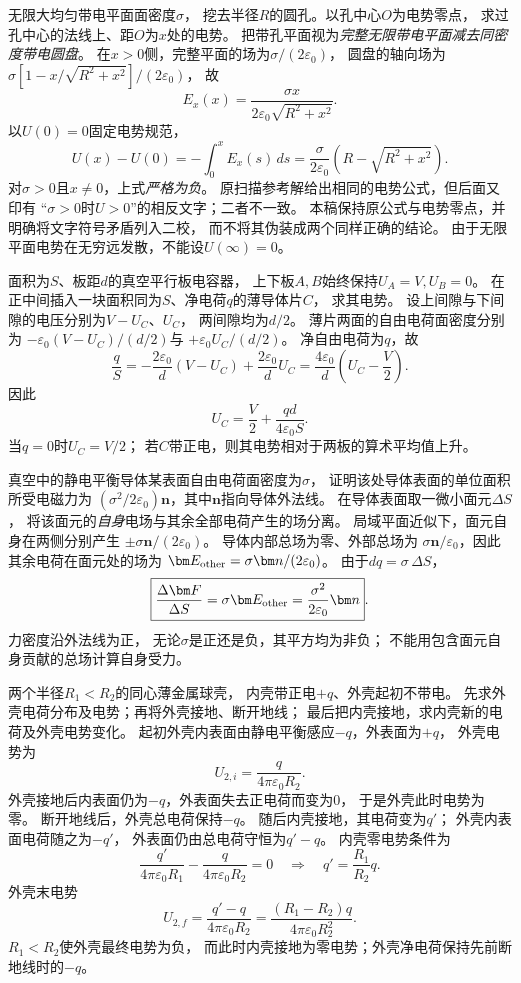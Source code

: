 \problemtext 无限大均匀带电平面面密度$\sigma$，
挖去半径$R$的圆孔。以孔中心$O$为电势零点，
求过孔中心的法线上、距$O$为$x$处的电势。
\workings
把带孔平面视为\emph{完整无限带电平面减去同密度带电圆盘}。
在$x>0$侧，完整平面的场为$\sigma/(2\varepsilon_0)$，
圆盘的轴向场为
$\sigma[1-x/\sqrt{R^2+x^2}]/(2\varepsilon_0)$，
故
\[
\boxed{E_x(x)=\frac{\sigma x}{2\varepsilon_0\sqrt{R^2+x^2}}}.
\]
以$U(0)=0$固定电势规范，
\[
\boxed{U(x)-U(0)
=-\int_0^x E_x(s)\,ds
=\frac{\sigma}{2\varepsilon_0}
\left(R-\sqrt{R^2+x^2}\right)}.
\]
\crosscheck 对$\sigma>0$且$x\ne0$，上式\emph{严格为负}。
原扫描参考解给出相同的电势公式，但后面又印有
“$\sigma>0$时$U>0$”的相反文字；二者不一致。
本稿保持原公式与电势零点，并明确将文字符号矛盾列入二校，
而不将其伪装成两个同样正确的结论。
由于无限平面电势在无穷远发散，不能设$U(\infty)=0$。

\problemtext 面积为$S$、板距$d$的真空平行板电容器，
上下板$A,B$始终保持$U_A=V,U_B=0$。
在正中间插入一块面积同为$S$、净电荷$q$的薄导体片$C$，
求其电势。
\workings
设上间隙与下间隙的电压分别为$V-U_C$、$U_C$，
两间隙均为$d/2$。
薄片两面的自由电荷面密度分别为
$-\varepsilon_0(V-U_C)/(d/2)$与
$+\varepsilon_0U_C/(d/2)$。
净自由电荷为$q$，故
\[
\frac qS=-\frac{2\varepsilon_0}{d}(V-U_C)
+\frac{2\varepsilon_0}{d}U_C
=\frac{4\varepsilon_0}{d}\left(U_C-\frac V2\right).
\]
因此
\[
\boxed{U_C=\frac V2+\frac{qd}{4\varepsilon_0S}}.
\]
\crosscheck 当$q=0$时$U_C=V/2$；
若$C$带正电，则其电势相对于两板的算术平均值上升。

\problemtext 真空中的静电平衡导体某表面自由电荷面密度为$\sigma$，
证明该处导体表面的单位面积所受电磁力为
$(\sigma^2/2\varepsilon_0)\bm n$，其中$\bm n$指向导体外法线。
\workings
在导体表面取一微小面元$\Delta S$，
将该面元的\emph{自身}电场与其余全部电荷产生的场分离。
局域平面近似下，面元自身在两侧分别产生
$\pm \sigma\bm n/(2\varepsilon_0)$。
导体内部总场为零、外部总场为
$\sigma\bm n/\varepsilon_0$，因此其余电荷在面元处的场为
$\bm E_{\rm other}=\sigma\bm n/(2\varepsilon_0)$。
由于$dq=\sigma\,\Delta S$，
\[
\boxed{\frac{\Delta\bm F}{\Delta S}
=\sigma\bm E_{\rm other}
=\frac{\sigma^2}{2\varepsilon_0}\bm n}.
\]
\crosscheck 力密度沿外法线为正，
无论$\sigma$是正还是负，其平方均为非负；
不能用包含面元自身贡献的总场计算自身受力。

\problemtext 两个半径$R_1<R_2$的同心薄金属球壳，
内壳带正电$+q$、外壳起初不带电。
先求外壳电荷分布及电势；再将外壳接地、断开地线；
最后把内壳接地，求内壳新的电荷及外壳电势变化。
\workings
起初外壳内表面由静电平衡感应$-q$，外表面为$+q$，
外壳电势为
\[
\boxed{U_{2,i}=\frac{q}{4\pi\varepsilon_0R_2}}.
\]
外壳接地后内表面仍为$-q$，外表面失去正电荷而变为0，
于是外壳此时电势为零。
断开地线后，外壳总电荷保持$-q$。
随后内壳接地，其电荷变为$q'$；
外壳内表面电荷随之为$-q'$，
外表面仍由总电荷守恒为$q'-q$。
内壳零电势条件为
\[
\frac{q'}{4\pi\varepsilon_0R_1}
-\frac{q}{4\pi\varepsilon_0R_2}=0
\quad\Longrightarrow\quad
\boxed{q'=\frac{R_1}{R_2}q}.
\]
外壳末电势
\[
\boxed{U_{2,f}=
\frac{q'-q}{4\pi\varepsilon_0R_2}
=\frac{(R_1-R_2)q}{4\pi\varepsilon_0R_2^2}}.
\]
\crosscheck $R_1<R_2$使外壳最终电势为负，
而此时内壳接地为零电势；外壳净电荷保持先前断地线时的$-q$。

